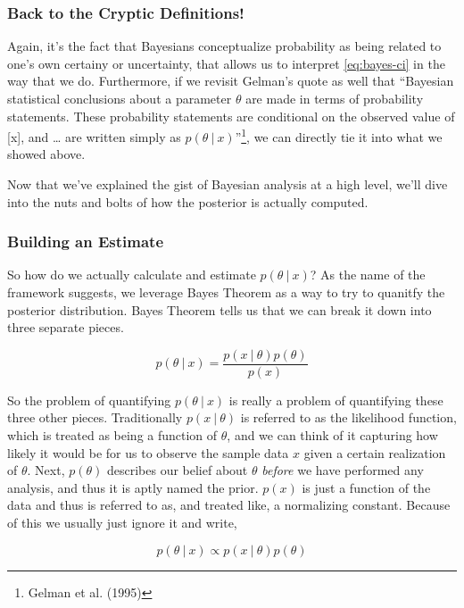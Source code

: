 \documentclass[12pt,twoside]{reedthesis}
\begin{document}
\hypertarget{back-to-the-cryptic-definitions}{%
\subsubsection{Back to the Cryptic Definitions!}\label{back-to-the-cryptic-definitions}}

Again, it's the fact that Bayesians conceptualize probability as being related to one's own certainy or uncertainty, that allows us to interpret \eqref{eq:bayes-ci} in the way that we do. Furthermore, if we revisit Gelman's quote as well that ``Bayesian statistical conclusions about a parameter \(\theta\) are made in terms of probability statements. These probability statements are conditional on the observed value of {[}x{]}, and \ldots{} are written simply as \(p(\theta \ | \ x)\)''\footnote{Gelman et al. (1995)}, we can directly tie it into what we showed above.

Now that we've explained the gist of Bayesian analysis at a high level, we'll dive into the nuts and bolts of how the posterior is actually computed.

\hypertarget{building-an-estimate}{%
\subsubsection{Building an Estimate}\label{building-an-estimate}}

So how do we actually calculate and estimate \(p(\theta \ | \ x)\)? As the name of the framework suggests, we leverage Bayes Theorem as a way to try to quanitfy the posterior distribution. Bayes Theorem tells us that we can break it down into three separate pieces.

\[
p(\theta \ | \ x) =  \frac{p(x \ | \ \theta)p(\theta)}{p(x)}
\]

So the problem of quantifying \(p(\theta \ | \ x)\) is really a problem of quantifying these three other pieces. Traditionally \(p(x \ | \ \theta)\) is referred to as the likelihood function, which is treated as being a function of \(\theta\), and we can think of it capturing how likely it would be for us to observe the sample data \(x\) given a certain realization of \(\theta\). Next, \(p(\theta)\) describes our belief about \(\theta\) \emph{before} we have performed any analysis, and thus it is aptly named the prior. \(p(x)\) is just a function of the data and thus is referred to as, and treated like, a normalizing constant. Because of this we usually just ignore it and write,

\[
p(\theta \ | \ x) \propto p(x \ | \ \theta)p(\theta)
\]
\end{document}
